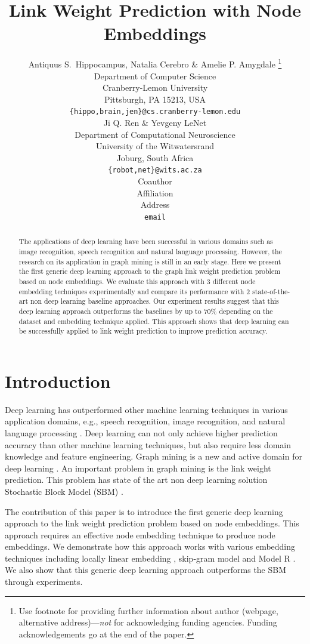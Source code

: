 \documentclass{article} %
\title{Link Weight Prediction with Node Embeddings}
\author{Antiquus S.~Hippocampus, Natalia Cerebro \& Amelie P. Amygdale \thanks{ Use footnote for providing further information
about author (webpage, alternative address)---\emph{not} for acknowledging
funding agencies.  Funding acknowledgements go at the end of the paper.} \\
Department of Computer Science\\
Cranberry-Lemon University\\
Pittsburgh, PA 15213, USA \\
\texttt{\{hippo,brain,jen\}@cs.cranberry-lemon.edu} \\
\And
Ji Q. Ren \& Yevgeny LeNet \\
Department of Computational Neuroscience \\
University of the Witwatersrand \\
Joburg, South Africa \\
\texttt{\{robot,net\}@wits.ac.za} \\
\AND
Coauthor \\
Affiliation \\
Address \\
\texttt{email}
}
\begin{document}
\maketitle

\begin{abstract}
The applications of deep learning have been successful in various domains 
such as image recognition, speech recognition and natural language 
processing.
However, the research on its application in graph mining is 
still in an early stage.
Here we present the first generic deep learning approach to the graph link weight prediction problem based on node embeddings.
We evaluate this approach with 3 different node embedding techniques experimentally and compare its performance with 2 state-of-the-art non deep learning baseline approaches.
Our experiment results suggest that this deep learning approach outperforms the baselines by up to 70\% depending on the dataset and embedding technique applied.
This approach shows that deep learning can be successfully applied to 
link weight prediction to improve prediction accuracy.
\end{abstract}

\section{Introduction}
Deep learning has outperformed other machine learning techniques in various 
application domains, e.g., speech recognition, image recognition,
and natural language processing \citep{simonyan2014very} \citep{yao2013recurrent}.
Deep learning can not only achieve higher prediction accuracy than other machine learning techniques,
but also require less domain knowledge and feature engineering.
Graph mining is a new and active domain for deep learning \citep{grover2016node2vec}.
An important problem in graph mining is the link weight prediction.
This problem has state of the art non deep learning solution Stochastic Block Model (SBM) \citep{aicher2014learning}.

The contribution of this paper is to introduce
the first generic deep learning approach to the link weight prediction problem based on node embeddings.
This approach requires an effective node embedding technique to produce node embeddings.
We demonstrate how this approach works with various embedding techniques including locally linear embedding \citep{roweis2000nonlinear}, skip-gram model \citep{grover2016node2vec} and Model R \citep{hou2017deep}.
We also show that this generic deep learning approach outperforms the SBM through experiments.
\end{document}
